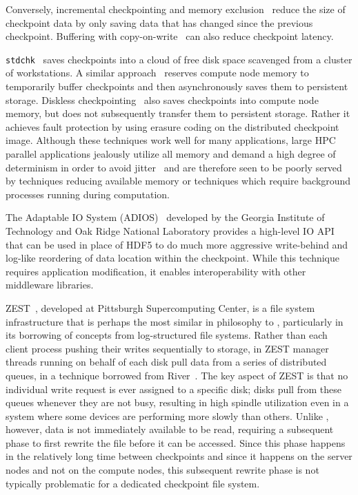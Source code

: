 
Conversely, incremental checkpointing and memory
exclusion~\cite{pcl:99:me,pxn:95:scd} reduce the size of checkpoint data by
only saving data that has changed since the previous checkpoint.  Buffering
with copy-on-write~\cite{li-298215} can also reduce checkpoint latency.




{\tt stdchk}~\cite{stdchk} saves checkpoints into a cloud of free disk space
scavenged from a cluster of workstations.  A similar
approach~\cite{aggregate-memory} reserves compute node memory to temporarily
buffer checkpoints and then asynchronously saves them to persistent storage.
Diskless checkpointing~\cite{diskless} also  
saves checkpoints into compute node memory, but does not subsequently transfer
them to persistent storage.  Rather it achieves fault protection by using erasure 
coding on the distributed checkpoint image. 
Although these techniques work well for many applications, large HPC parallel
applications jealously utilize all memory and demand a high degree of
determinism in order to avoid jitter~\cite{DusseauPhd98} and are therefore seen
to be poorly served by techniques reducing available memory or techniques which
require background processes running during computation.

The Adaptable IO System (ADIOS)~\cite{adios} developed by the Georgia Institute
of Technology and Oak Ridge National Laboratory provides a high-level IO API
that can be used in place of HDF5 to do much more aggressive write-behind and
log-like reordering of data location within the checkpoint. While this technique
requires application modification, it enables interoperability with other
middleware libraries. 

ZEST~\cite{zest}, developed at Pittsburgh Supercomputing Center, is a file
system infrastructure that is perhaps the most similar in philosophy to \plfs,
particularly in its borrowing of concepts from log-structured file systems.
Rather than each client process pushing their writes sequentially to storage,
in ZEST manager threads running on behalf of each disk pull data from a series
of distributed queues, in a technique borrowed from
River~\cite{Arpaci-Dusseau03-TOCS}.  The key aspect of ZEST is that no
individual write request is ever assigned to a specific disk; disks pull from
these queues whenever they are not busy, resulting in high spindle utilization
even in a system where some devices are performing more slowly than others.
Unlike \plfs, however, data is not immediately available to be read, requiring
a subsequent phase to first rewrite the file before it can be accessed.  Since
this phase happens in the relatively long time between checkpoints and since it
happens on the server nodes and not on the compute nodes, this subsequent
rewrite phase is not typically problematic for a dedicated checkpoint file
system.
